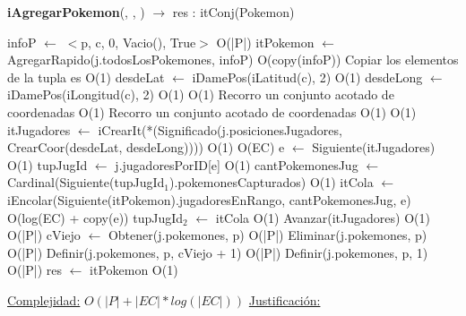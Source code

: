 \begin{algorithm}[H]{\textbf{iAgregarPokemon}(, , ) $\to$ res : itConj(Pokemon)}
	\begin{algorithmic}
		\State infoP $\gets$ $<$p, c, 0, Vacio(), True$>$	\Comment O(|P|)
		\State itPokemon $\gets$ AgregarRapido(j.todosLosPokemones, infoP)	\Comment O(copy(infoP)) {Copiar los elementos de la tupla es O(1)}
		\State desdeLat $\gets$ iDamePos(iLatitud(c), 2) \Comment O(1)
		\State desdeLong $\gets$ iDamePos(iLongitud(c), 2) \Comment O(1)
			\Comment O(1) {Recorro un conjunto acotado de coordenadas}
				\Comment O(1) {Recorro un conjunto acotado de coordenadas}
				 \Comment O(1)
						\Comment O(1)
						\State itJugadores $\gets$ iCrearIt(*(Significado(j.posicionesJugadores, CrearCoor(desdeLat, desdeLong))))	\Comment O(1)
							\Comment O(EC)
							\State e $\gets$ Siguiente(itJugadores)	\Comment O(1)
							\State tupJugId $\gets$ j.jugadoresPorID[e]	\Comment O(1)
							\State cantPokemonesJug $\gets$ Cardinal(Siguiente(tupJugId$_{1}$).pokemonesCapturados)	\Comment O(1)
							\State itCola $\gets$ iEncolar(Siguiente(itPokemon).jugadoresEnRango, cantPokemonesJug, e)	\Comment O(log(EC) + copy(e))
							\State tupJugId$_{2}$ $\gets$ itCola	\Comment O(1)
							\State Avanzar(itJugadores)	\Comment O(1)
						\EndWhile
					\EndIf
				\EndIf
			\EndWhile
		\EndWhile
			\Comment O(|P|)
			\State cViejo $\gets$ Obtener(j.pokemones, p)	\Comment O(|P|)
			\State Eliminar(j.pokemones, p)	\Comment O(|P|)
			\State Definir(j.pokemones, p, cViejo + 1)	\Comment O(|P|)
		\Else
			\State Definir(j.pokemones, p, 1)	\Comment O(|P|)
		\EndIf
		\State res $\gets$ itPokemon	\Comment O(1)
	
		\medskip
		\Statex \underline{Complejidad:} $O(|P| + |EC| * log(|EC|))$
		\Statex \underline{Justificación:}
    \end{algorithmic}
\end{algorithm}

